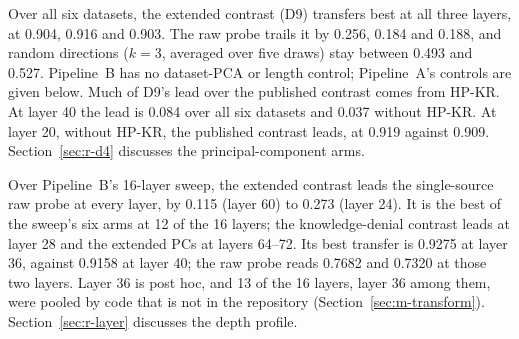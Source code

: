 Over all six datasets, the extended contrast (D9) transfers best at all three layers, at 0.904, 0.916 and 0.903. %
The raw probe trails it by 0.256, 0.184 and 0.188, and random directions ($k=3$, averaged over five draws) stay between 0.493 and 0.527. %
Pipeline~B has no dataset-PCA or length control; Pipeline~A's controls are given below. %
Much of D9's lead over the published contrast comes from HP-KR. %
At layer 40 the lead is 0.084 over all six datasets and 0.037 without HP-KR. %
At layer 20, without HP-KR, the published contrast leads, at 0.919 against 0.909. %
Section~\ref{sec:r-d4} discusses the principal-component arms.

Over Pipeline~B's 16-layer sweep, the extended contrast leads the single-source raw probe at every layer, by 0.115 (layer 60) to 0.273 (layer 24). %
It is the best of the sweep's six arms at 12 of the 16 layers; the knowledge-denial contrast leads at layer 28 and the extended PCs at layers 64--72. %
Its best transfer is 0.9275 at layer 36, against 0.9158 at layer 40; the raw probe reads 0.7682 and 0.7320 at those two layers. %
Layer 36 is post hoc, and 13 of the 16 layers, layer 36 among them, were pooled by code that is not in the repository (Section~\ref{sec:m-transform}). %
Section~\ref{sec:r-layer} discusses the depth profile.

